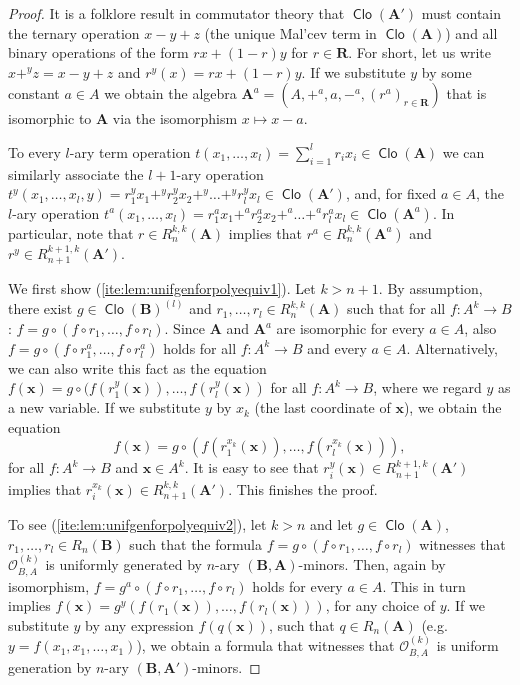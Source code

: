 \documentclass[11pt]{amsart}
\theoremstyle{plain}
\theoremstyle{definition}
\newcommand{\alg}[1]{\mathbf{#1}}
\newcommand{\clonoid}[1]{\mathcal{#1}}
\newcommand{\clodO}{\clonoid{O}}
\newcommand{\algA}{\alg{A}}
\newcommand{\algB}{\alg{B}}
\newcommand{\algR}{\alg{R}}
\renewcommand\vec{\mathbf}
\newcommand{\vx}{\vec{x}}
\DeclareMathOperator{\Clo}{\mathsf{Clo}}
\begin{document}
\begin{proof}
It is a folklore result in commutator theory that $\Clo(\algA')$ must contain the ternary operation $x-y+z$ (the unique Mal'cev term in $\Clo(\algA)$) and all binary operations of the form $rx+ (1-r)y$ for $r\in \algR$. For short, let us write $x+^y z = x-y+z$ and $r^y(x) = rx+ (1-r)y$. If we substitute $y$ by some constant $a\in A$ we obtain the algebra $\algA^a = (A,+^a,a,-^a,(r^a)_{r\in \algR})$ that is isomorphic to $\algA$ via the isomorphism $x \mapsto x-a$.

To every $l$-ary term operation $t(x_1,\ldots,x_l) = \sum_{i=1}^{l} r_i x_i \in \Clo(\algA)$ we can similarly associate the $l+1$-ary operation $t^y(x_1,\ldots,x_{l},y) = r_1^y x_1 +^y r_2^y x_2 +^y \ldots +^y r_{l}^y x_{l} \in \Clo(\algA')$, and, for fixed $a\in A$, the $l$-ary operation $t^a(x_1,\ldots,x_{l}) = r_1^a x_1 +^a r_2^a x_2 +^a \ldots +^a r_{l}^a x_{l} \in \Clo(\algA^a)$. In particular, note that $r \in R_n^{k,k}(\algA)$ implies that $r^a \in R_{n}^{k,k}(\algA^a)$ and $r^y \in R_{n+1}^{k+1,k}(\algA')$.

We first show (\ref{ite:lem:unifgenforpolyequiv1}). Let $k > n+1$. By assumption, there exist $g \in \Clo(\algB)^{(l)}$ and $r_1,\ldots,r_{l} \in R_n^{k,k}(\algA)$ such that for all $f\colon A^k \to B$: $f = g \circ (f\circ r_1, \ldots,f\circ r_{l})$. Since $\algA$ and $\algA^a$ are isomorphic for every $a\in A$, also $f = g \circ (f\circ r_1^a, \ldots,f\circ r_l^a)$ holds for all $f\colon A^k \to B$ and every $a\in A$. Alternatively, we can also write this fact as the equation $f(\mathbf x) = g \circ (f(r_1^{y}(\vx)), \ldots,f(r_l^{y}(\vx))$ for all $f\colon A^k \to B$, where we regard $y$ as a new variable. If we substitute $y$ by $x_k$ (the last coordinate of $\vx$), we obtain the equation
$$f(\mathbf x) = g \circ (f(r_1^{x_k}(\vx)), \ldots,f(r_l^{x_k}(\vx))),$$
for all $f\colon A^k \to B$ and $\vx \in A^k$. It is easy to see that $r_i^{y}(\vx) \in R_{n+1}^{k+1,k}(\algA')$ implies that $r_i^{x_k}(\vx) \in R_{n+1}^{k,k}(\algA')$. This finishes the proof.

To see (\ref{ite:lem:unifgenforpolyequiv2}), let $k>n$ and let $g \in \Clo(\algA)$, $r_1,\ldots,r_l \in R_n(\algB)$ such that the formula $f = g \circ (f\circ r_1, \ldots,f\circ r_l)$ witnesses that $\clodO_{B,A}^{(k)}$ is uniformly generated by $n$-ary $(\algB, \algA)$-minors. Then, again by isomorphism, $f = g^{a} \circ (f\circ r_1, \ldots,f\circ r_l)$ holds for every $a \in A$. This in turn implies $f(\mathbf x) = g^{y} (f(r_1(\mathbf x)), \ldots,f(r_l(\mathbf x)))$, for any choice of $y$. If we substitute $y$ by any expression $f(q(\vx))$, such that $q \in R_n(\algA)$ (e.g. $y = f(x_1,x_1,\ldots,x_1)$), we obtain a formula that witnesses that $\clodO_{B,A}^{(k)}$ is uniform generation by $n$-ary $(\algB, \algA')$-minors.
\end{proof}
\end{document}
